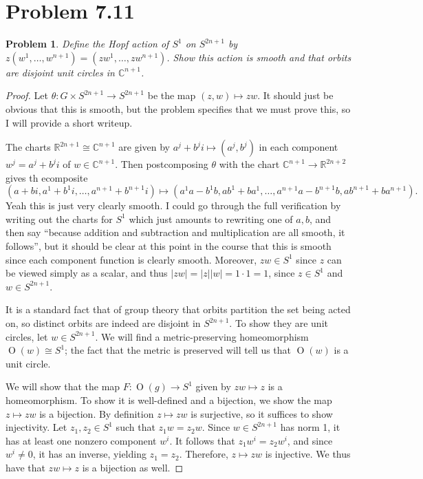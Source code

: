 \documentclass[11pt, letterpaper]{article}
\theoremstyle{plain}
\newtheorem{problem}{Problem}
\begin{document}
\section{Problem 7.11}
\begin{problem}
	Define the \emph{Hopf action} of $S^1$ on $S^{2n+1} $ by $z(w^1 , \ldots ,w^{n+1} )=(zw^1, \ldots ,zw^{n+1})$. Show this action is smooth and that orbits are disjoint unit circles in $\mathbb{C} ^{n+1} $.
\end{problem}
\begin{proof}
	Let $\theta : G\times S^{2n+1}  \to S^{2n+1} $ be the map $(z,w)\mapsto zw$. It should just be obvious that this is smooth, but the problem specifies that we must prove this, so I will provide a short writeup.

	The charts $\mathbb{R} ^{2n+1} \cong \mathbb{C} ^{n+1} $ are given by $a^j + b^ji\mapsto (a^j,b^j)$ in each component $w^j=a^j+b^ji$ of $w\in\mathbb{C} ^{n+1} $. Then postcomposing $\theta $ with the chart $\mathbb{C} ^{n+1} \to \mathbb{R} ^{2n+2} $ gives th ecomposite
	\[
		(a+bi,a^1+b^1i, \ldots ,a^{n+1} + b^{n+1}i )\mapsto \left( a^1a - b^1b, ab^1+ba^1, \ldots , a^{n+1} a-b^{n+1} b,ab^{n+1} +ba^{n+1}  \right) 
	.\]
	Yeah this is just very clearly smooth. I could go through the full verification by writing out the charts for $S^1$ which just amounts to rewriting one of $a,b$, and then say ``because addition and subtraction and multiplication are all smooth, it follows'', but it should be clear at this point in the course that this is smooth since each component function is clearly smooth. Moreover, $zw\in S^1$ since $z$ can be viewed simply as a scalar, and thus $\left| zw \right| =\left| z \right| \left| w \right| =1\cdot 1=1$, since $z\in S^1$ and $w\in S^{2n+1} $.

	It is a standard fact that of group theory that orbits partition the set being acted on, so distinct orbits are indeed are disjoint in $S^{2n+1} $. To show they are unit circles, let $w\in S^{2n+1} $. We will find a metric-preserving homeomorphism $\operatorname{O} (w) \cong S^1$; the fact that the metric is preserved will tell us that $\operatorname{O} (w)$ is a unit circle.

	We will show that the map $F : \operatorname{O} (g) \to S^1$ given by $zw\mapsto z$ is a homeomorphism. To show it is well-defined and a bijection, we show the map $z\mapsto zw$ is a bijection. By definition $z\mapsto zw$ is surjective, so it suffices to show injectivity. Let $z_1,z_2\in S^1$ such that $z_1w=z_2w$. Since $w\in S^{2n+1} $ has norm 1, it has at least one nonzero component $w^i$. It follows that $z_1w^i=z_2w^i$, and since $w^i \neq 0$, it has an inverse, yielding $z_1=z_2$. Therefore, $z\mapsto zw$ is injective. We thus have that $zw\mapsto z$ is a bijection as well.


\end{proof}
\end{document}
